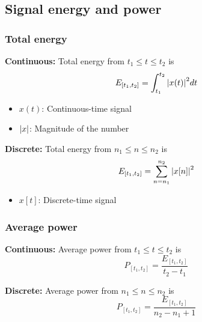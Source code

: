 \subsection{Signal energy and power}
    \subsubsection{Total energy}
    \begin{definition}
        
        \textbf{Continuous:} Total energy from $t_1 \leq t \leq t_2$ is 
        \begin{equation}
            E_{[t_1,t_2]} = \int_{t_1}^{t_2} \abs{x(t)}^2 dt
        \end{equation}
        \begin{itemize}
            \item $x(t)$: Continuous-time signal
            \item $\abs{x}$: Magnitude of the number
        \end{itemize}

        \textbf{Discrete:} Total energy from $n_1 \leq n \leq n_2$ is
        \begin{equation}
            E_{[t_1,t_2]} = \sum_{n=n_1}^{n_2} \abs{x[n]}^2
        \end{equation}
        \begin{itemize}
            \item $x[t]$: Discrete-time signal
        \end{itemize}
    \end{definition}

    \subsubsection{Average power}
    \begin{definition}

        \textbf{Continuous:} Average power from $t_1 \leq t \leq t_2$ is 
        \begin{equation}
            P_{[t_1,t_2]} = \frac{E_{[t_1,t_2]}}{t_2 - t_1} 
        \end{equation}

        \textbf{Discrete:} Average power from $n_1 \leq n \leq n_2$ is
        \begin{equation}
            P_{[t_1,t_2]} = \frac{E_{[t_1,t_2]}}{n_2 - n_1 + 1} 
        \end{equation}
    \end{definition}


